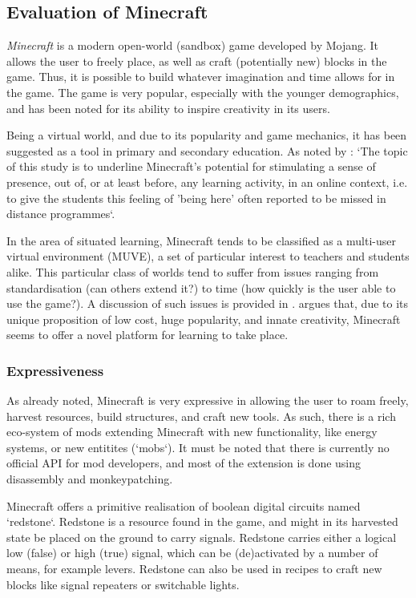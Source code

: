 \subsection{Evaluation of Minecraft}

\textit{Minecraft} is a modern open-world (sandbox) game developed by Mojang. It
allows the user to freely place, as well as craft (potentially new) blocks in
the game. Thus, it is possible to build whatever imagination and time allows for
in the game. The game is very popular, especially with the younger demographics,
and has been noted for its ability to inspire creativity in its
users.\cite{minecraftign}

Being a virtual world, and due to its popularity and game mechanics, it has been
suggested as a tool in primary and secondary education. As noted by
\cite{coudrayminecraft}: `The topic of this study is to underline Minecraft's
potential for stimulating a sense of presence, out of, or at least before, any
learning activity, in an online context, i.e. to give the students this feeling
of 'being here' often reported to be missed in distance programmes`.

In the area of situated learning, Minecraft tends to be classified as a
multi-user virtual environment (MUVE), a set of particular interest to teachers
and students alike. This particular class of worlds tend to suffer from issues
ranging from standardisation (can others extend it?) to time (how quickly is the
user able to use the game?). A discussion of such issues is provided in
\cite{dawley2014situated}. \cite{coudrayminecraft} argues that, due to its
unique proposition of low cost, huge popularity, and innate creativity,
Minecraft seems to offer a novel platform for learning to take place.

\subsubsection{Expressiveness}

As already noted, Minecraft is very expressive in allowing the user to roam
freely, harvest resources, build structures, and craft new tools. As such, there
is a rich eco-system of mods extending Minecraft with new functionality, like
energy systems, or new entitites (`mobs`). It must be noted that there is
currently no official API for mod developers, and most of the extension is done
using disassembly and monkeypatching.

Minecraft offers a primitive realisation of boolean digital circuits named
`redstone`. Redstone is a resource found in the game, and might in its harvested
state be placed on the ground to carry signals. Redstone carries either a
logical low (false) or high (true) signal, which can be (de)activated by a
number of means, for example levers. Redstone can also be used in recipes to
craft new blocks like signal repeaters or switchable lights.

